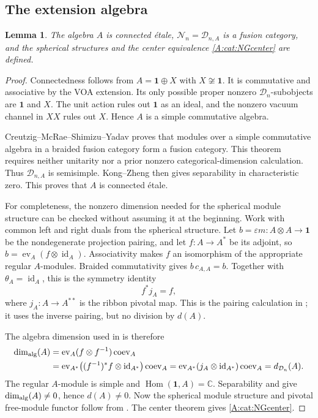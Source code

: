\documentclass[11pt]{article}
\newtheorem{lemma}[theorem]{Lemma}
\newcommand{\C}{\mathbb C}\newcommand{\Q}{\mathbb Q}\newcommand{\Z}{\mathbb Z}
\newcommand{\one}{\mathbf1}\newcommand{\D}{\mathcal D}\newcommand{\Dcat}{\mathcal D}
\newcommand{\Ncat}{\mathcal N}\newcommand{\Pcat}{\mathcal P}\newcommand{\Fcat}{\mathcal F}
\newcommand{\Hom}{\operatorname{Hom}}\newcommand{\id}{\operatorname{id}}
\numberwithin{equation}{section}
\begin{document}
\subsection{The extension algebra}
\begin{lemma}\label{A:cat:etale}
The algebra $A$ is connected \'etale, $\Ncat_n=\D_{n,A}$ is a fusion category, and the spherical structures and the center equivalence \eqref{A:cat:NGcenter} are defined.
\end{lemma}
\begin{proof}
Connectedness follows from $A=\one\oplus X$ with $X\not\cong\one$. It is commutative and associative by the VOA extension. Its only possible proper nonzero $\D_n$-subobjects are $\one$ and $X$. The unit action rules out $\one$ as an ideal, and the nonzero vacuum channel in $XX$ rules out $X$. Hence $A$ is a simple commutative algebra.

Creutzig--McRae--Shimizu--Yadav \cite[Theorem 2.26]{A:CMSY} proves that modules over a simple commutative algebra in a braided fusion category form a fusion category. This theorem requires neither unitarity nor a prior nonzero categorical-dimension calculation. Thus $\D_{n,A}$ is semisimple. Kong--Zheng \cite[Theorem 6.10]{A:KZ} then gives separability in characteristic zero. This proves that $A$ is connected \'etale.

For completeness, the nonzero dimension needed for the spherical module structure can be checked without assuming it at the beginning. Work with common left and right duals from the spherical structure. Let $b=\varepsilon m:A\otimes A\to\one$ be the nondegenerate projection pairing, and let $f:A\to A^*$ be its adjoint, so $b=\operatorname{ev}_A(f\otimes\id_A)$. Associativity makes $f$ an isomorphism of the appropriate regular $A$-modules. Braided commutativity gives $b\,c_{A,A}=b$. Together with $\theta_A=\id_A$, this is the symmetry identity
\[
 f^*j_A=f,
\]
where $j_A:A\to A^{**}$ is the ribbon pivotal map. This is the pairing calculation in \cite[Lemma~1.13]{A:KO}; it uses the inverse pairing, but no division by $d(A)$.

The algebra dimension used in \cite[Definition~6.1]{A:KZ} is therefore
\begin{align*}
 \dim_{\rm alg}(A)
 &=\operatorname{ev}_A(f\otimes f^{-1})\operatorname{coev}_A\\
 &=\operatorname{ev}_{A^*}\bigl((f^{-1})^*f\otimes\id_{A^*}\bigr)\operatorname{coev}_A
 =\operatorname{ev}_{A^*}(j_A\otimes\id_{A^*})\operatorname{coev}_A
 =d_{\D_n}(A).
\end{align*}
The regular $A$-module is simple and $\Hom(\one,A)=\C$. Separability and \cite[Theorem~6.3]{A:KZ} give $\dim_{\rm alg}(A)\ne0$, hence $d(A)\ne0$. Now the spherical module structure and pivotal free-module functor follow from \cite[Theorems~1.17--1.18 and Remark~1.19]{A:KO}. The center theorem \cite[Corollary~3.30]{A:DMNO} gives \eqref{A:cat:NGcenter}.
\end{proof}
\end{document}
